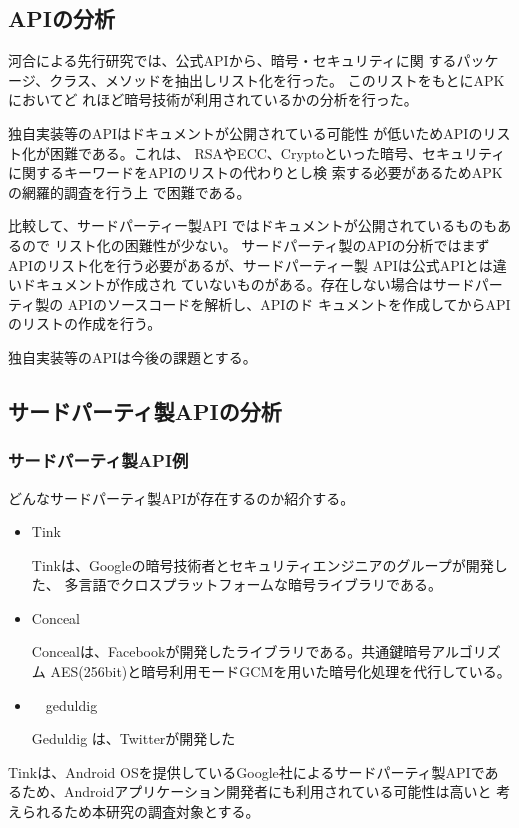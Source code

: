 \subsection{APIの分析}
河合による先行研究では、公式APIから、暗号・セキュリティに関
するパッケージ、クラス、メソッドを抽出しリスト化を行った。
このリストをもとにAPKにおいてど
れほど暗号技術が利用されているかの分析を行った。

独自実装等のAPIはドキュメントが公開されている可能性
が低いためAPIのリスト化が困難である。これは、
RSAやECC、Cryptoといった暗号、セキュリティ
に関するキーワードをAPIのリストの代わりとし検
索する必要があるためAPKの網羅的調査を行う上
で困難である。

比較して、サードパーティー製API
ではドキュメントが公開されているものもあるので
リスト化の困難性が少ない。
サードパーティ製のAPIの分析ではまずAPIのリスト化を行う必要があるが、サードパーティー製
APIは公式APIとは違いドキュメントが作成され
ていないものがある。存在しない場合はサードパー
ティ製の APIのソースコードを解析し、APIのド
キュメントを作成してからAPIのリストの作成を行う。

独自実装等のAPIは今後の課題とする。

\subsection{サードパーティ製APIの分析}

\subsubsection{サードパーティ製API例}
どんなサードパーティ製APIが存在するのか紹介する。
\begin{itemize}
\item Tink　

Tinkは、Googleの暗号技術者とセキュリティエンジニアのグループが開発した、
多言語でクロスプラットフォームな暗号ライブラリである。

\item Conceal

Concealは、Facebookが開発したライブラリである。共通鍵暗号アルゴリズム AES(256bit)と暗号利用モードGCMを用いた暗号化処理を代行している。

\item　geduldig 

 
Geduldig は、Twitterが開発した
\end{itemize}
Tinkは、Android OSを提供しているGoogle社によるサードパーティ製APIであるため、Androidアプリケーション開発者にも利用されている可能性は高いと
考えられるため本研究の調査対象とする。


